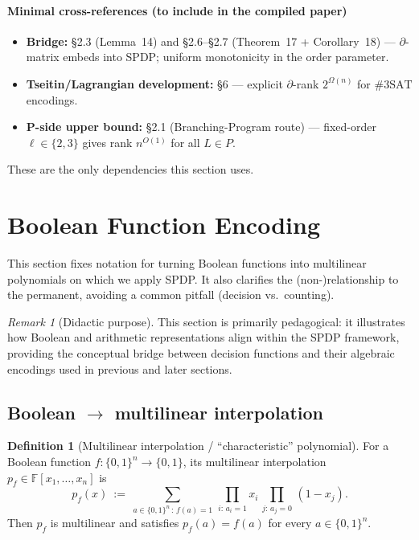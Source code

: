 \documentclass[12pt]{article}
\theoremstyle{definition}
\newtheorem{definition}{Definition}
\theoremstyle{definition}
\theoremstyle{remark}
\newtheorem{remark}{Remark}
\theoremstyle{remark}
\begin{document}
\paragraph{Minimal cross-references (to include in the compiled paper)}
\begin{itemize}
\item \textbf{Bridge:} \S2.3 (Lemma~14) and \S2.6--\S2.7 (Theorem~17 + Corollary~18) --- $\partial$-matrix embeds into SPDP; uniform monotonicity in the order parameter.
\item \textbf{Tseitin/Lagrangian development:} \S6 --- explicit $\partial$-rank $2^{\Omega(n)}$ for $\#3\mathrm{SAT}$ encodings.
\item \textbf{P-side upper bound:} \S2.1 (Branching-Program route) --- fixed-order $\ell\in\{2,3\}$ gives rank $n^{O(1)}$ for all $L\in P$.
\end{itemize}

These are the only dependencies this section uses.


\section{Boolean Function Encoding}
\label{sec:boolean-encoding}

This section fixes notation for turning Boolean functions into multilinear polynomials on which we apply SPDP. It also clarifies the (non-)relationship to the permanent, avoiding a common pitfall (decision vs.\ counting).

\begin{remark}[Didactic purpose]
This section is primarily pedagogical: it illustrates how Boolean and arithmetic representations align within the SPDP framework, providing the conceptual bridge between decision functions and their algebraic encodings used in previous and later sections.
\end{remark}

\subsection{Boolean $\to$ multilinear interpolation}

\begin{definition}[Multilinear interpolation / ``characteristic'' polynomial]\label{def:multilinear-interpolation}
For a Boolean function $f:\{0,1\}^n\to\{0,1\}$, its multilinear interpolation $p_f\in\mathbb{F}[x_1,\dots,x_n]$ is
\begin{equation}\label{eq:bool-to-poly}
p_f(x)\ :=\ \sum_{a\in\{0,1\}^n\,:\,f(a)=1}\,\prod_{i:\,a_i=1} x_i\,\prod_{j:\,a_j=0}\,(1-x_j).
\end{equation}
Then $p_f$ is multilinear and satisfies $p_f(a)=f(a)$ for every $a\in\{0,1\}^n$.
\end{definition}
\end{document}
